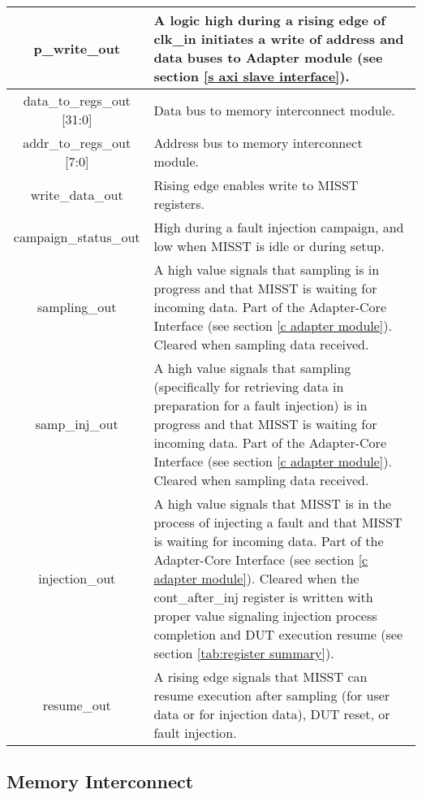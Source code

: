 \documentclass[]{report}
\begin{document}
\begin{center}
\begin{longtable}{|c|p{11cm}|}
		\hline
		p\_write\_out & A logic high during a rising edge of clk\_in initiates a write of address and data buses to Adapter module (see section \ref{s axi slave interface}).\\
		\hline
		data\_to\_regs\_out [31:0] & Data bus to memory interconnect module.\\
		\hline
		addr\_to\_regs\_out [7:0] & Address bus to memory interconnect module.\\
		\hline
		write\_data\_out & Rising edge enables write to MISST registers.\\
		\hline
		campaign\_status\_out & High during a fault injection campaign, and low when MISST is idle or during setup.\\
		\hline
		sampling\_out & A high value signals that sampling is in progress and that MISST is waiting for incoming data. Part of the Adapter-Core Interface (see section \ref{c adapter module}). Cleared when sampling data received.\\
		\hline
		samp\_inj\_out & A high value signals that sampling (specifically for retrieving data in preparation for a fault injection) is in progress and that MISST is waiting for incoming data. Part of the Adapter-Core Interface (see section \ref{c adapter module}). Cleared when sampling data received.\\
		\hline
		injection\_out & A high value signals that MISST is in the process of injecting a fault and that MISST is waiting for incoming data. Part of the Adapter-Core Interface (see section \ref{c adapter module}). Cleared when the cont\_after\_inj register is written with proper value signaling injection process completion and DUT execution resume (see section \ref{tab:register summary}).\\
		\hline
		resume\_out & A rising edge signals that MISST can resume execution after sampling (for user data or for injection data), DUT reset, or fault injection.\\
		\hline
	\end{longtable} 
\end{center}

\subsection{Memory Interconnect}
\label{ss mem interconnect}
\end{document}
